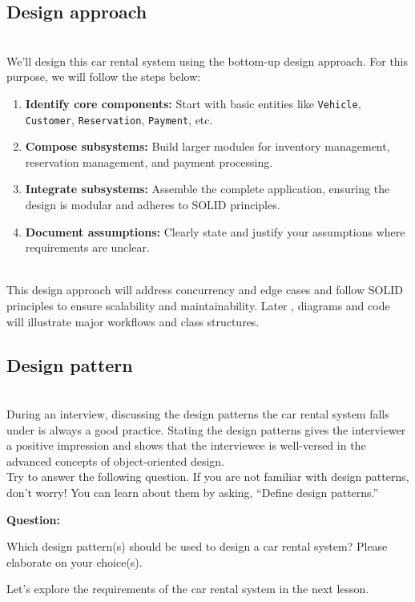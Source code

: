 \subsection{Design approach}\label{DvplzTYkwtkDcfrTaxgUV}
\\
We'll design this car rental system using the bottom-up design approach. For this purpose, we will follow the steps below:

\begin{enumerate}
\item
\protect{}\label{QH-9Ze9uEP4uNUfZJ9U8d}
\textbf{Identify core components:} Start with basic entities like \texttt{Vehicle}, \texttt{Customer}, \texttt{Reservation}, \texttt{Payment}, etc.
\item
\protect{}\label{xpy41Wd6tYoh18luCXbkE}
\textbf{Compose subsystems:} Build larger modules for inventory management, reservation management, and payment processing.
\item
\protect{}\label{BrFbUOqrA6H-PPAsk3_ia}
\textbf{Integrate subsystems:} Assemble the complete application, ensuring the design is modular and adheres to SOLID principles.
\item
\protect{}\label{VlV3uPQd7XN3o9VXx9x2A}
\textbf{Document assumptions:} Clearly state and justify your assumptions where requirements are unclear.
\end{enumerate}
\\
This design approach will address concurrency and edge cases and follow SOLID principles to ensure scalability and maintainability. Later , diagrams and code will illustrate major workflows and class structures.

\subsection{Design pattern~}\label{vNK0ZMHjkb8rwm-LVZXIE}
\\
During an interview, discussing the design patterns the car rental system falls under is always a good practice. Stating the design patterns gives the interviewer a positive impression and shows that the interviewee is well-versed in the advanced concepts of object-oriented design.
\\
Try to answer the following question. If you are not familiar with design patterns, don't worry! You can learn about them by asking, ``Define design patterns.''

\textbf{Question:}

Which design pattern(s) should be used to design a car rental system? Please elaborate on your choice(s).

Let's explore the requirements of the car rental system in the next lesson.

